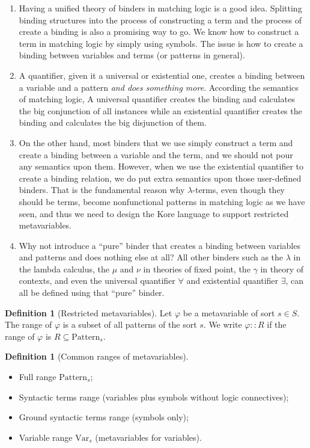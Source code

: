 \documentclass{article}
\newcounter{thmcounter}
\theoremstyle{plain}
\theoremstyle{definition}
\newtheorem{definition}[thmcounter]{Definition}
\theoremstyle{remark}
\begin{document}
{\begin{enumerate}
\item Having a unified theory of binders in matching logic is a good idea. Splitting binding structures into the process of constructing a term and the process of create a binding is also a promising way to go. We know how to construct a term in matching logic by simply using symbols. The issue is how to create a binding between variables and terms (or patterns in general).
\item A quantifier, given it a universal or existential one, creates a binding between a variable and a pattern \emph{and does something more}. According the semantics of matching logic, A universal quantifier creates the binding and calculates the big conjunction of all instances while an existential quantifier creates the binding and calculates the big disjunction of them. 
\item On the other hand, most binders that we use simply construct a term and create a binding between a variable and the term, and we should not pour any semantics upon them. However, when we use the existential quantifier to create a binding relation, we do put extra semantics upon those user-defined binders. That is the fundamental reason why $\lambda$-terms, even though they should be terms, become nonfunctional patterns in matching logic as we have seen, and thus we need to design the Kore language to support restricted metavariables.
\item Why not introduce a ``pure'' binder that creates a binding between variables and patterns and does nothing else at all? All other binders such as the $\lambda$ in the lambda calculus, the $\mu$ and $\nu$ in theories of fixed point, the $\gamma$ in theory of contexts, and even the universal quantifier $\forall$ and existential quantifier $\exists$, can all be defined using that ``pure'' binder.
\end{enumerate}
}
\begin{definition}[Restricted metavariables]
Let $\varphi$ be a metavariable of sort $s \in S$. The range of $\varphi$ is a subset of all patterns of the sort $s$. We write $\varphi :: R$ if the range of $\varphi$ is $R \subseteq \mathrm{Pattern}_s$.
\end{definition}

\begin{definition}[Common ranges of metavariables]
\quad
\begin{itemize}
\item Full range $\mathrm{Pattern}_s$;
\item Syntactic terms range (variables plus symbols without logic connectives);
\item Ground syntactic terms range (symbols only); 
\item Variable range $\mathrm{Var}_s$ (metavariables for variables).
\end{itemize}
\end{definition}
\end{document}

